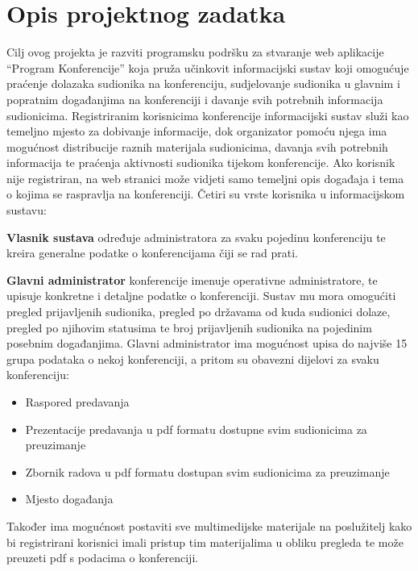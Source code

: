 \chapter{Opis projektnog zadatka}
		
	
		
	
    Cilj ovog projekta je razviti programsku podršku 
    za stvaranje web aplikacije “Program Konferencije” 
    koja pruža učinkovit informacijski sustav koji omogućuje
    praćenje dolazaka sudionika na konferenciju, 
    sudjelovanje sudionika u glavnim i popratnim događanjima na
    konferenciji i davanje svih potrebnih informacija sudionicima. 
    Registriranim korisnicima konferencije informacijski 
    sustav služi kao temeljno mjesto za dobivanje informacije,
    dok organizator pomoću njega ima mogućnost distribucije 
    raznih materijala sudionicima, davanja svih potrebnih 
    informacija te praćenja aktivnosti sudionika 
    tijekom konferencije. 
    Ako korisnik nije registriran, na web stranici može 
    vidjeti samo temeljni opis događaja i tema o kojima 
    se raspravlja na konferenciji.
    \newline
    \newline
    Četiri su vrste korisnika u informacijskom sustavu:
    
    \item\textbf{Vlasnik sustava} određuje administratora za svaku pojedinu konferenciju te kreira
    generalne podatke o konferencijama čiji se rad prati.
		
	\item\textbf{Glavni administrator} konferencije imenuje operativne administratore,  te upisuje konkretne i detaljne podatke o konferenciji. Sustav mu mora omogućiti pregled prijavljenih sudionika, pregled po državama od kuda sudionici dolaze, pregled po njihovim statusima te broj prijavljenih sudionika na pojedinim posebnim događanjima. Glavni administrator ima mogućnost 
	upisa do najviše 15 grupa podataka o nekoj konferenciji, a pritom su obavezni dijelovi za svaku konferenciju:
	\begin{itemize}
		    \item   Raspored predavanja
		    \item   Prezentacije predavanja u pdf formatu dostupne svim sudionicima za preuzimanje
		    \item  Zbornik radova u pdf formatu dostupan svim sudionicima za preuzimanje
		    \item   Mjesto događanja
		\end{itemize}
		\newline
	   Također ima mogućnost postaviti sve multimedijske materijale na poslužitelj kako bi registrirani korisnici imali pristup tim materijalima u obliku pregleda te može preuzeti pdf s podacima o konferenciji.
		
